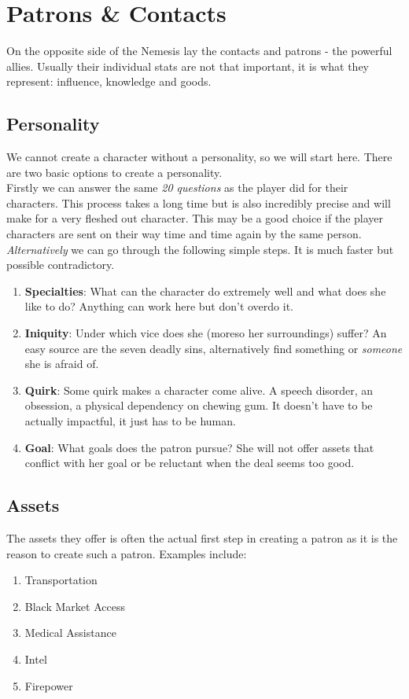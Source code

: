 \documentclass[12pt,a4paper,openany]{book}
\begin{document}
	\chapter{Patrons \& Contacts}
	On the opposite side of the Nemesis lay the contacts and patrons - the powerful allies. Usually their individual stats are not that important, it is what they represent: influence, knowledge and goods.
	\section*{Personality}
	We cannot create a character without a personality, so we will start here. There are two basic options to create a personality.\\
	Firstly we can answer the same \emph{20 questions} as the player did for their characters. This process takes a long time but is also incredibly precise and will make for a very fleshed out character. This may be a good choice if the player characters are sent on their way time and time again by the same person.
	\emph{Alternatively} we can go through the following simple steps. It is much faster but possible contradictory.
	\begin{enumerate}
		\setlength\itemsep{-8mm} \vspace{-8mm}
		\item \textbf{Specialties}: What can the character do extremely well and what does she like to do? Anything can work here but don't overdo it.
		\item \textbf{Iniquity}: Under which vice does she (moreso her surroundings) suffer? An easy source are the seven deadly sins, alternatively find something or \emph{someone} she is afraid of.
		\item \textbf{Quirk}: Some quirk makes a character come alive. A speech disorder, an obsession, a physical dependency on chewing gum. It doesn't have to be actually impactful, it just has to be human.
		\item \textbf{Goal}: What goals does the patron pursue? She will not offer assets that conflict with her goal or be reluctant when the deal seems too good.
	\end{enumerate}
	\section*{Assets}
	The assets they offer is often the actual first step in creating a patron as it is the reason to create such a patron. Examples include:
	\begin{enumerate}
		\setlength\itemsep{-8mm} \vspace{-8mm}
		\item Transportation
		\item Black Market Access
		\item Medical Assistance
		\item Intel
		\item Firepower
	\end{enumerate}
\end{document}
